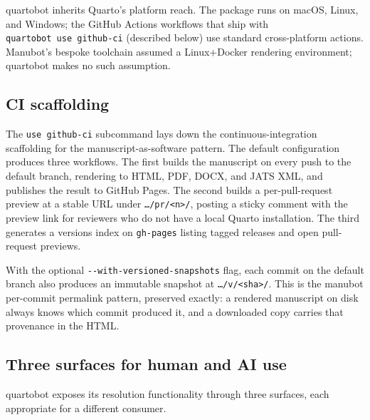 \documentclass[
  letterpaper,
  DIV=11,
  numbers=noendperiod]{scrartcl}
\begin{document}
quartobot inherits Quarto's platform reach. The package runs on macOS,
Linux, and Windows; the GitHub Actions workflows that ship with
\texttt{quartobot\ use\ github-ci} (described below) use standard
cross-platform actions. Manubot's bespoke toolchain assumed a
Linux+Docker rendering environment; quartobot makes no such assumption.

\subsection{CI scaffolding}\label{ci-scaffolding}

The \texttt{use\ github-ci} subcommand lays down the
continuous-integration scaffolding for the manuscript-as-software
pattern. The default configuration produces three workflows. The first
builds the manuscript on every push to the default branch, rendering to
HTML, PDF, DOCX, and JATS XML, and publishes the result to GitHub Pages.
The second builds a per-pull-request preview at a stable URL under
\texttt{…/pr/\textless{}n\textgreater{}/}, posting a sticky comment with
the preview link for reviewers who do not have a local Quarto
installation. The third generates a versions index on \texttt{gh-pages}
listing tagged releases and open pull-request previews.

With the optional \texttt{-\/-with-versioned-snapshots} flag, each
commit on the default branch also produces an immutable snapshot at
\texttt{…/v/\textless{}sha\textgreater{}/}. This is the manubot
per-commit permalink pattern, preserved exactly: a rendered manuscript
on disk always knows which commit produced it, and a downloaded copy
carries that provenance in the HTML.

\subsection{Three surfaces for human and AI
use}\label{three-surfaces-for-human-and-ai-use}

quartobot exposes its resolution functionality through three surfaces,
each appropriate for a different consumer.
\end{document}
